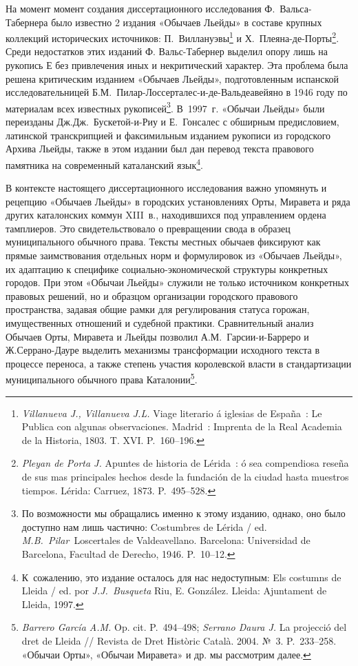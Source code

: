 На момент момент создания диссертационного исследования Ф.~Вальса-Табернера было известно 2 издания «Обычаев Льейды» в составе крупных коллекций исторических источников: П.~Виллануэвы\footnote{\emph{Villanueva J., Villanueva J.L. }Viage literario á iglesias de España~: Le Publica con algunas observaciones. Madrid~: Imprenta de la Real Academia de la Historia, 1803. T. XVI. P.~160--196.} и Х.~Плеяна-де-Порты\footnote{\emph{Pleyan de Porta J. }Apuntes de historia de Lérida~: ó sea compendiosa reseña de sus mas principales hechos desde la fundación de la ciudad hasta muestros tiempos. Lérida: Carruez, 1873. P.~495--528.}. Среди недостатков этих изданий Ф. Вальс-Табернер выделил опору лишь на рукопись Е без привлечения иных и некритический характер. Эта проблема была решена критическим изданием «Обычаев Льейды», подготовленным испанской исследовательницей Б.М.~Пилар-Лоссерталес-и-де-Вальдеавейяно в 1946 году по материалам всех известных рукописей\footnote{По возможности мы обращались именно к этому изданию, однако, оно было доступно нам лишь частично: Costumbres de Lérida / ed. \emph{M.B.~Pilar}~Loscertales de Valdeavellano. Barcelona: Universidad de Barcelona, Facultad de Derecho, 1946. P.~10--12.}. В~1997~г. «Обычаи Льейды» были переизданы Дж.Дж.~Бускетой-и-Риу и Е.~Гонсалес с обширным предисловием, латинской транскрипцией и факсимильным изданием рукописи из городского Архива Льейды, также в этом издании был дан перевод текста правового памятника на современный каталанский язык\footnote{К~сожалению, это издание осталось для нас недоступным: Els costumns de Lleida / ed. por \emph{J.J.~Busqueta} Riu, E. González. Lleida: Ajuntament de Lleida, 1997.}.

В контексте настоящего диссертационного исследования важно упомянуть и рецепцию «Обычаев Льейды» в городских установлениях Орты, Миравета и ряда других каталонских коммун XIII~в., находившихся под управлением ордена тамплиеров. Это свидетельствовало о превращении свода в образец муниципального обычного права. Тексты местных обычаев фиксируют как прямые заимствования отдельных норм и формулировок из «Обычаев Льейды», их адаптацию к специфике социально-экономической структуры конкретных городов. При этом «Обычаи Льейды» служили не только источником конкретных правовых решений, но и образцом организации городского правового пространства, задавая общие рамки для регулирования статуса горожан, имущественных отношений и судебной практики. Сравнительный анализ Обычаев Орты, Миравета и Льейды позволил А.М.~Гарсии-и-Барреро и Ж.Серрано-Дауре выделить механизмы трансформации исходного текста в процессе переноса, а также степень участия королевской власти в стандартизации муниципального обычного права Каталонии\footnote{\emph{Barrero García A.M. }Op. cit. P.~494--498; \emph{Serrano Daura J. }La projecció del dret de Lleida // Revista de Dret Històric Català. 2004. №~3. P.~233--258. «Обычаи Орты», «Обычаи Миравета» и др. мы рассмотрим далее.}.

